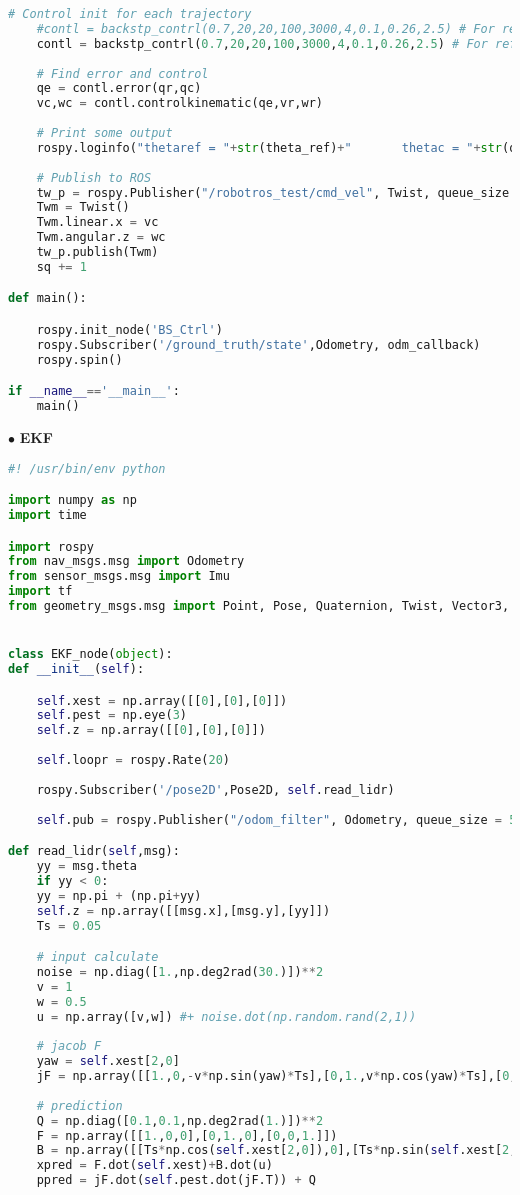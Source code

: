 \begin{appendices}
\begin{lstlisting}[language=Python]
	# Control init for each trajectory
	#contl = backstp_contrl(0.7,20,20,100,3000,4,0.1,0.26,2.5) # For ref_circle
	contl = backstp_contrl(0.7,20,20,100,3000,4,0.1,0.26,2.5) # For ref_8
	
	# Find error and control
	qe = contl.error(qr,qc)
	vc,wc = contl.controlkinematic(qe,vr,wr)
	
	# Print some output
	rospy.loginfo("thetaref = "+str(theta_ref)+"       thetac = "+str(qc[2,0]))
	
	# Publish to ROS
	tw_p = rospy.Publisher("/robotros_test/cmd_vel", Twist, queue_size = 50)
	Twm = Twist()
	Twm.linear.x = vc
	Twm.angular.z = wc
	tw_p.publish(Twm)
	sq += 1

def main():

	rospy.init_node('BS_Ctrl')
	rospy.Subscriber('/ground_truth/state',Odometry, odm_callback)
	rospy.spin()

if __name__=='__main__':
	main()

\end{lstlisting}


$\bullet$ \textbf{EKF}\par
\begin{lstlisting}[language=Python]
#! /usr/bin/env python

import numpy as np
import time

import rospy
from nav_msgs.msg import Odometry
from sensor_msgs.msg import Imu
import tf
from geometry_msgs.msg import Point, Pose, Quaternion, Twist, Vector3, Pose2D


class EKF_node(object):
def __init__(self):

	self.xest = np.array([[0],[0],[0]])
	self.pest = np.eye(3)
	self.z = np.array([[0],[0],[0]])
	
	self.loopr = rospy.Rate(20)
	
	rospy.Subscriber('/pose2D',Pose2D, self.read_lidr)
	
	self.pub = rospy.Publisher("/odom_filter", Odometry, queue_size = 50)

def read_lidr(self,msg):
	yy = msg.theta
	if yy < 0:
	yy = np.pi + (np.pi+yy)
	self.z = np.array([[msg.x],[msg.y],[yy]])
	Ts = 0.05

	# input calculate
	noise = np.diag([1.,np.deg2rad(30.)])**2
	v = 1
	w = 0.5
	u = np.array([v,w]) #+ noise.dot(np.random.rand(2,1))
	
	# jacob F
	yaw = self.xest[2,0]
	jF = np.array([[1.,0,-v*np.sin(yaw)*Ts],[0,1.,v*np.cos(yaw)*Ts],[0,0,1.]])
	
	# prediction
	Q = np.diag([0.1,0.1,np.deg2rad(1.)])**2
	F = np.array([[1.,0,0],[0,1.,0],[0,0,1.]])
	B = np.array([[Ts*np.cos(self.xest[2,0]),0],[Ts*np.sin(self.xest[2,0]),0],[0,Ts]])
	xpred = F.dot(self.xest)+B.dot(u)
	ppred = jF.dot(self.pest.dot(jF.T)) + Q
	

\end{lstlisting}
\end{appendices}
